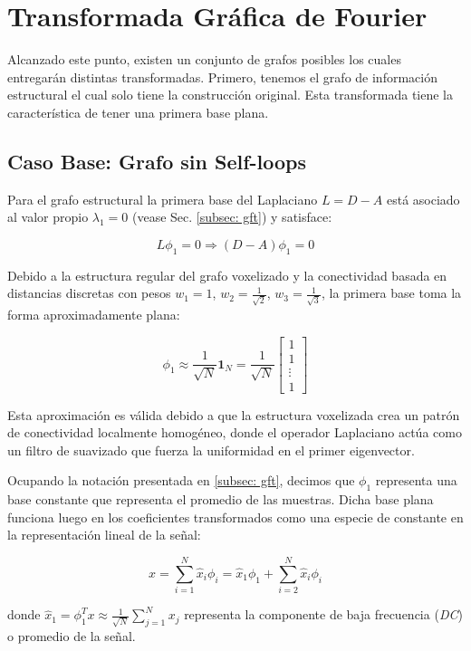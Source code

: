 \section{Transformada Gráfica de Fourier}\label{sec:method_gft}

    Alcanzado este punto, existen un conjunto de grafos posibles los cuales entregarán distintas transformadas. Primero, tenemos el grafo de información estructural el cual solo tiene la construcción original. Esta transformada tiene la característica de tener una primera base plana.
    
    \subsection{Caso Base: Grafo sin Self-loops}
    
    Para el grafo estructural la primera base del Laplaciano $L = D - A$ está asociado al valor propio $\lambda_1 = 0$ (vease Sec. \ref{subsec: gft}) y satisface:
    
    $$L\phi_1 = 0 \Rightarrow (D - A)\phi_1 = 0$$
    
    Debido a la estructura regular del grafo voxelizado y la conectividad basada en distancias discretas con pesos $w_1 = 1$, $w_2 = \frac{1}{\sqrt{2}}$, $w_3 = \frac{1}{\sqrt{3}}$, la primera base toma la forma aproximadamente plana:
    
    $$\phi_1 \approx \frac{1}{\sqrt{N}} \mathbf{1}_N = \frac{1}{\sqrt{N}} \begin{bmatrix} 1 \\ 1 \\ \vdots \\ 1 \end{bmatrix}$$
    
    Esta aproximación es válida debido a que la estructura voxelizada crea un patrón de conectividad localmente homogéneo, donde el operador Laplaciano actúa como un filtro de suavizado que fuerza la uniformidad en el primer eigenvector.
    
    Ocupando la notación presentada en \ref{subsec: gft}, decimos que $\phi_1$ representa una base constante que representa el promedio de las muestras. Dicha base plana funciona luego en los coeficientes transformados como una especie de constante en la representación lineal de la señal:
    
    $$x = \sum_{i=1}^{N} \hat{x}_i \phi_i = \hat{x}_1 \phi_1 + \sum_{i=2}^{N} \hat{x}_i \phi_i$$
    
    donde $\hat{x}_1 = \phi_1^T x \approx \frac{1}{\sqrt{N}} \sum_{j=1}^{N} x_j$ representa la componente de baja frecuencia (\textit{DC}) o promedio de la señal.
    
